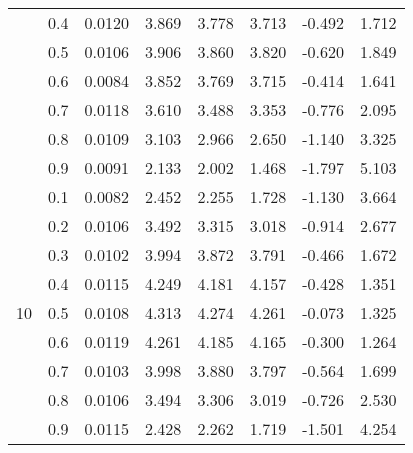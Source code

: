 \documentclass[11pt,a4paper]{report}
\begin{document}
\begin{longtable}{ | c | c || c | c | c | c | c | c | }
 & 0.4 & 0.0120 & 3.869 & 3.778 & 3.713 & -0.492 & 1.712 \\
 & 0.5 & 0.0106 & 3.906 & 3.860 & 3.820 & -0.620 & 1.849 \\
 & 0.6 & 0.0084 & 3.852 & 3.769 & 3.715 & -0.414 & 1.641 \\
 & 0.7 & 0.0118 & 3.610 & 3.488 & 3.353 & -0.776 & 2.095 \\
 & 0.8 & 0.0109 & 3.103 & 2.966 & 2.650 & -1.140 & 3.325 \\
 & 0.9 & 0.0091 & 2.133 & 2.002 & 1.468 & -1.797 & 5.103 \\
 \hline
\multirow{9}{*}{10} & 0.1 & 0.0082 & 2.452 & 2.255 & 1.728 & -1.130 & 3.664 \\
 & 0.2 & 0.0106 & 3.492 & 3.315 & 3.018 & -0.914 & 2.677 \\
 & 0.3 & 0.0102 & 3.994 & 3.872 & 3.791 & -0.466 & 1.672 \\
 & 0.4 & 0.0115 & 4.249 & 4.181 & 4.157 & -0.428 & 1.351 \\
 & 0.5 & 0.0108 & 4.313 & 4.274 & 4.261 & -0.073 & 1.325 \\
 & 0.6 & 0.0119 & 4.261 & 4.185 & 4.165 & -0.300 & 1.264 \\
 & 0.7 & 0.0103 & 3.998 & 3.880 & 3.797 & -0.564 & 1.699 \\
 & 0.8 & 0.0106 & 3.494 & 3.306 & 3.019 & -0.726 & 2.530 \\
 & 0.9 & 0.0115 & 2.428 & 2.262 & 1.719 & -1.501 & 4.254 \\
 \hline
\hline
\end{longtable}
\end{document}
